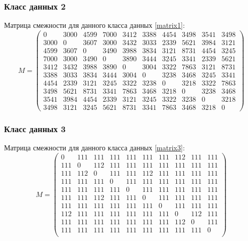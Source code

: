 \subsubsection{Класс данных 2}
Матрица смежности для данного класса данных \eqref{matrix1}:
\begin{equation}
\label{matrix1}
M = \begin{pmatrix}
0  &3000  &4599  &7000  &3412  &3388  &4454  &3498  &3541  &3498 \\
3000  &0  &3607  &3000  &3432  &3033  &2339  &5621  &3984  &3121 \\
4599  &3607  &0  &3490  &3988  &3834  &3121  &8731  &4454  &3245 \\
7000  &3000  &3490  &0  &3890  &3444  &3245  &3341  &2339  &5621 \\
3412  &3432  &3988  &3890  &0  &3004  &3322  &7863  &3121  &8731 \\ 
3388  &3033  &3834  &3444  &3004  &0  &3238  &3468  &3245  &3341 \\
4454  &2339  &3121  &3245  &3322  &3238  &0  &3218  &3322  &7863 \\
3498  &5621  &8731  &3341  &7863  &3468  &3218  &0  &3238  &3468 \\
3541  &3984  &4454  &2339  &3121  &3245  &3322  &3238  &0  &3218\\
3498  &3121  &3245  &5621  &8731  &3341  &7863  &3468  &3218  &0 
\end{pmatrix}
\end{equation}


\subsubsection{Класс данных 3}
Матрица смежности для данного класса данных \eqref{matrix3}:
\begin{equation}
\label{matrix3}
M = \begin{pmatrix}
0    &111  &111  &111  &111  &111  &111  &112  &111  &111 \\
111  &0    &112  &111  &111  &111  &111  &111  &111  &111 \\
111  &112  &0    &111  &111  &112  &111  &111  &111  &111 \\
111  &111  &111  &0    &111  &111  &111  &111  &111  &111 \\
111  &111  &111  &111  &0    &111  &111  &111  &111  &111 \\
111  &111  &112  &111  &111  &0    &111  &111  &111  &111 \\
111  &111  &111  &111  &111  &111  &0    &111  &111  &111 \\
112  &111  &111  &111  &111  &111  &111  &0    &112  &111 \\
111  &111  &111  &111  &111  &111  &111  &112  &0    &111 \\
111  &111  &111  &111  &111  &111  &111  &111  &111  &0 \\
\end{pmatrix}
\end{equation}

